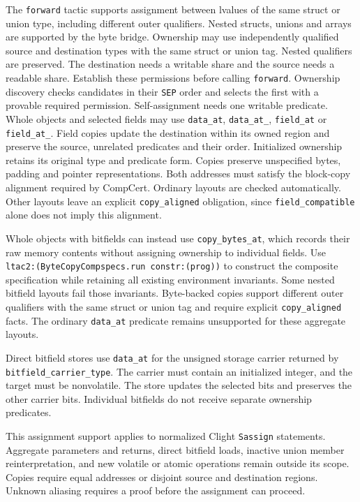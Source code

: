 \documentclass[12pt,fleqn,openany,oneside,showtrims]{memoir}
\begin{document}
The \lstinline{forward} tactic supports assignment between lvalues of the
same struct or union type, including different outer qualifiers.
Nested structs, unions and arrays are supported by the byte bridge.
Ownership may use independently qualified source and destination types
with the same struct or union tag. Nested qualifiers are preserved.
The destination needs a writable share and the source
needs a readable share. Establish these permissions before calling
\lstinline{forward}. Ownership discovery checks candidates in their
\lstinline{SEP} order and selects the first with a provable required
permission. Self-assignment needs one writable predicate.
Whole objects and selected fields may use \lstinline{data_at},
\lstinline{data_at_}, \lstinline{field_at} or \lstinline{field_at_}.
Field copies update the destination within its owned region and preserve
the source, unrelated predicates and their order. Initialized ownership
retains its original type and predicate form.
Copies preserve unspecified bytes, padding and pointer representations.
Both addresses must satisfy the block-copy alignment required by CompCert. Ordinary
layouts are checked automatically. Other layouts leave an explicit
\lstinline{copy_aligned} obligation, since \lstinline{field_compatible}
alone does not imply this alignment.

Whole objects with bitfields can instead use \lstinline{copy_bytes_at},
which records their raw memory contents without assigning ownership to
individual fields. Use
\lstinline{ltac2:(ByteCopyCompspecs.run constr:(prog))} to construct the
composite specification while retaining all existing environment
invariants. Some nested bitfield layouts fail those invariants.
Byte-backed copies support different outer qualifiers with the same
struct or union tag and require explicit \lstinline{copy_aligned} facts.
The ordinary \lstinline{data_at} predicate remains unsupported for these
aggregate layouts.

Direct bitfield stores use \lstinline{data_at} for the unsigned storage
carrier returned by \lstinline{bitfield_carrier_type}. The carrier must
contain an initialized integer, and the target must be nonvolatile.
The store updates the selected bits and preserves the other carrier bits.
Individual bitfields do not receive separate ownership predicates.

This assignment support applies to normalized Clight
\lstinline{Sassign} statements. Aggregate parameters and returns,
direct bitfield loads, inactive union member reinterpretation, and new
volatile or atomic operations remain outside its scope. Copies require
equal addresses or disjoint source and destination regions. Unknown
aliasing requires a proof before the assignment can proceed.
\end{document}
